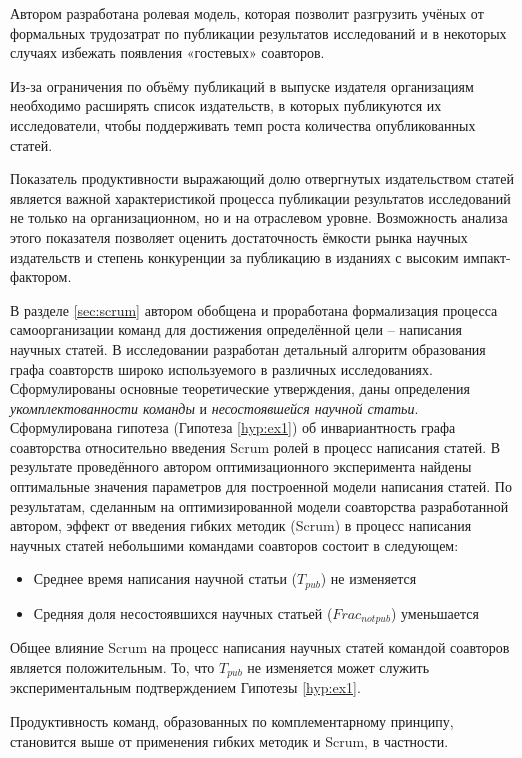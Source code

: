 Автором разработана ролевая модель, которая позволит разгрузить учёных от формальных трудозатрат по публикации результатов исследований и в некоторых случаях избежать появления «гостевых» соавторов.

Из-за ограничения по объёму публикаций в выпуске издателя организациям необходимо расширять список издательств, в которых публикуются их исследователи, чтобы поддерживать темп роста количества опубликованных статей. 

Показатель продуктивности выражающий долю отвергнутых издательством статей является важной характеристикой процесса публикации результатов исследований не только на организационном, но и на отраслевом уровне. Возможность анализа этого показателя позволяет оценить достаточность ёмкости рынка научных издательств и степень конкуренции за публикацию в изданиях с высоким импакт-фактором. 


В разделе \ref{sec:scrum} автором обобщена и проработана формализация процесса самоорганизации команд для достижения определённой цели -- написания научных статей. 
В исследовании разработан детальный алгоритм образования графа соавторств широко используемого в различных исследованиях.
Сформулированы основные теоретические утверждения, даны определения \emph{укомплектованности команды} и \emph{несостоявшейся научной статьи}. 
Сформулирована гипотеза (Гипотеза \ref{hyp:ex1}) об инвариантность графа соавторства относительно введения Scrum ролей в процесс написания статей.
В результате проведённого автором оптимизационного эксперимента найдены оптимальные значения параметров для построенной  модели написания статей. 
По результатам, сделанным на оптимизированной модели соавторства разработанной автором, эффект от введения гибких методик (Scrum) в процесс написания научных статей небольшими командами соавторов состоит в следующем:

\begin{itemize}
\tightlist
\item  Среднее время написания научной статьи ($T_{pub}$) не  изменяется
\item  Средняя доля несостоявшихся научных статьей   ($Frac_{notpub}$) уменьшается
\end{itemize}

Общее влияние Scrum на процесс написания научных статей командой соавторов является положительным. 
То, что $T_{pub}$ не изменяется может служить экспериментальным подтверждением Гипотезы \ref{hyp:ex1}.

Продуктивность команд, образованных по комплементарному принципу, становится выше от применения гибких методик и Scrum, в частности.


